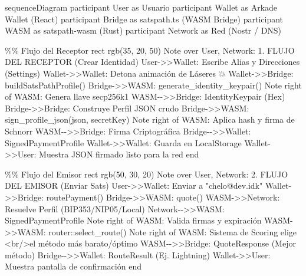 \documentclass[
]{article}
\newenvironment{Shaded}{}{}
\newcommand{\NormalTok}[1]{#1}
\begin{document}
\begin{Shaded}
\begin{Highlighting}[]
\NormalTok{sequenceDiagram}
\NormalTok{    participant User as Usuario}
\NormalTok{    participant Wallet as Arkade Wallet (React)}
\NormalTok{    participant Bridge as satspath.ts (WASM Bridge)}
\NormalTok{    participant WASM as satspath{-}wasm (Rust)}
\NormalTok{    participant Network as Red (Nostr / DNS)}
    
\NormalTok{    \%\% Flujo del Receptor}
\NormalTok{    rect rgb(35, 20, 50)}
\NormalTok{    Note over User, Network: 1. FLUJO DEL RECEPTOR (Crear Identidad)}
\NormalTok{    User{-}\textgreater{}\textgreater{}Wallet: Escribe Alias y Direcciones (Settings)}
\NormalTok{    Wallet{-}\textgreater{}\textgreater{}Wallet: Detona animación de Láseres 💥}
\NormalTok{    Wallet{-}\textgreater{}\textgreater{}Bridge: buildSatsPathProfile()}
\NormalTok{    Bridge{-}\textgreater{}\textgreater{}WASM: generate\_identity\_keypair()}
\NormalTok{    Note right of WASM: Genera llave secp256k1}
\NormalTok{    WASM{-}{-}\textgreater{}\textgreater{}Bridge: IdentityKeypair (Hex)}
\NormalTok{    Bridge{-}\textgreater{}\textgreater{}Bridge: Construye Perfil JSON crudo}
\NormalTok{    Bridge{-}\textgreater{}\textgreater{}WASM: sign\_profile\_json(json, secretKey)}
\NormalTok{    Note right of WASM: Aplica hash y firma de Schnorr}
\NormalTok{    WASM{-}{-}\textgreater{}\textgreater{}Bridge: Firma Criptográfica}
\NormalTok{    Bridge{-}{-}\textgreater{}\textgreater{}Wallet: SignedPaymentProfile}
\NormalTok{    Wallet{-}\textgreater{}\textgreater{}Wallet: Guarda en LocalStorage}
\NormalTok{    Wallet{-}\textgreater{}\textgreater{}User: Muestra JSON firmado listo para la red}
\NormalTok{    end}

\NormalTok{    \%\% Flujo del Emisor}
\NormalTok{    rect rgb(50, 30, 20)}
\NormalTok{    Note over User, Network: 2. FLUJO DEL EMISOR (Enviar Sats)}
\NormalTok{    User{-}\textgreater{}\textgreater{}Wallet: Enviar a "chelo@dev.idk"}
\NormalTok{    Wallet{-}\textgreater{}\textgreater{}Bridge: routePayment()}
\NormalTok{    Bridge{-}\textgreater{}\textgreater{}WASM: quote()}
\NormalTok{    WASM{-}\textgreater{}\textgreater{}Network: Resuelve Perfil (BIP353/NIP05/Local)}
\NormalTok{    Network{-}{-}\textgreater{}\textgreater{}WASM: SignedPaymentProfile}
\NormalTok{    Note right of WASM: Valida firmas y expiración}
\NormalTok{    WASM{-}\textgreater{}\textgreater{}WASM: router::select\_route()}
\NormalTok{    Note right of WASM: Sistema de Scoring elige \textless{}br/\textgreater{}el método más barato/óptimo}
\NormalTok{    WASM{-}{-}\textgreater{}\textgreater{}Bridge: QuoteResponse (Mejor método)}
\NormalTok{    Bridge{-}{-}\textgreater{}\textgreater{}Wallet: RouteResult (Ej. Lightning)}
\NormalTok{    Wallet{-}\textgreater{}\textgreater{}User: Muestra pantalla de confirmación}
\NormalTok{    end}
\end{Highlighting}
\end{Shaded}
\end{document}
